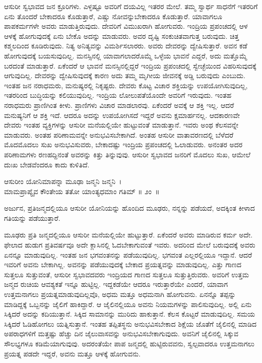 ಆಸುರೀ ಸ್ವಭಾವದ ಜನ ಕ್ರೂರಿಗಳು. ಎಳ್ಳಷ್ಟೂ ಅವರಿಗೆ ದಯವಿಲ್ಲ ಇತರರ ಮೇಲೆ. ತಮ್ಮ ಸ್ವಾರ್ಥ ಸಾಧನೆಗೆ ಇತರರಿಗೆ ಏನು ತೊಂದರೆ ಬೇಕಾದರೂ ಕೊಡುತ್ತಾರೆ, ಎಷ್ಚು ನೋವನ್ನು\break ಬೇಕಾದರೂ ಕೊಡುತ್ತಾರೆ. ಯಾವಾಗಲೂ ಪಾಪಕರ್ಮಗಳೇ ಅವರು ಮಾಡುತ್ತಿರುವುದು. ದೇವರಿಗೆ ವಿಮುಖರಾಗಿ ಹೋಗುವರು. ಇಂದ್ರಿಯ ಪ್ರಪಂಚದಲ್ಲಿ ಆಳ ಆಳಕ್ಕೆ ಹೋಗುವುದಕ್ಕೆ ಏನು ಬೇಕೊ ಅದನ್ನು ಮಾಡುವರು. ಅವರ ದೃಷ್ಟಿ ಸಂಕುಚಿತವಾಗುತ್ತ ಬರುವುದು. ಚಿತ್ತ ಕಶ್ಮಲದಿಂದ ಕೂಡಿರುವುದು. ನಿತ್ಯ ಅನಿತ್ಯವನ್ನು ವಿಮರ್ಶಿಸಲಾರರು. ಅವರು ದೇವರನ್ನು ದ್ವೇಷಿಸುತ್ತಾರೆ. ಅವನ ಕಡೆ ಹೋಗುವುದಕ್ಕೆ ಬಯಸುವುದಿಲ್ಲ. ಮನಸ್ಸಿನಲ್ಲಿ ಯಾವಾಗಲಾದರೊಮ್ಮೆ ಒಳ್ಳೆಯ ಭಾವನೆ ಎದ್ದರೆ, ಅದು ಮತ್ತೊಮ್ಮೆ ಬರದಂತೆ ಮಾಡುತ್ತಾರೆ. ಏಕೆಂದರೆ ಆ ಭಾವನೆ ಮನಸ್ಸಿನಲ್ಲಿದ್ದರೆ ಇಂದ್ರಿಯ ಪ್ರಪಂಚದಲ್ಲಿ ಸ್ವೇಚ್ಛೆಯಿಂದ ವಿಹರಿಸುವುದಕ್ಕೆ ಆಗುವುದಿಲ್ಲ. ದೇವರನ್ನು ದ್ವೇಷಿಸುವುದಕ್ಕೆ ಕಾರಣ ಅದು ತಮ್ಮ ಮೃಗೀಯ ಜೀವನಕ್ಕೆ ಅಡ್ಡಿ ಬರುವುದು ಎಂಬುದು. ಇಂತಹ ಜನ ನರಾಧಮರು, ಮನುಷ್ಯರಲ್ಲಿ ನಿಕೃಷ್ಟರು. ದೇವರು ಕೊಟ್ಟ ವಿಚಾರ ಶಕ್ತಿಯನ್ನು ಉಪಯೋಗಿಸುವುದಿಲ್ಲ, ಇತರರಿಂದ ಬುದ್ಧಿಯನ್ನು ಕಲಿಯುವುದಿಲ್ಲ. ಇಂದ್ರಿಯ ಲೋಲುಪತೆ\-ಯೊಂದೇ ಅವರಿಗೆ ಇರುವುದು. ಇಂತಹ ನರಾಧಮರು ಪ್ರಾಣಿಗಿಂತ ಕೀಳು. ಪ್ರಾಣಿಗಳು ವಿಚಾರ ಮಾಡಲಾರವು. ಏಕೆಂದರೆ ಅವಕ್ಕೆ ಆ ಶಕ್ತಿ ಇಲ್ಲ. ಆದರೆ ಮನುಷ್ಯನಿಗೆ ಆ ಶಕ್ತಿ ಇದೆ. ಆದರೂ ಅದನ್ನು ಉಪಯೋಗಿಸದೆ ಇದ್ದರೆ ಅವನು ಕ್ಷಮಾರ್ಹನಲ್ಲ. ಆದಕಾರಣವೇ ದೇವರು ಇಂತಹ ವ್ಯಕ್ತಿಗಳನ್ನು ಆಸುರೀ ಮನೆಯಲ್ಲಿಯೇ ಹುಟ್ಟುವಂತೆ ಮಾಡುತ್ತಾನೆ. ಇವರು ಅಂಥ ಕೆಲಸವನ್ನೇ ಮಾಡುವರು. ಅಂತಹ ಪರಿಣಾಮವನ್ನೇ ಅನುಭವಿಸಬೇಕಾಗಿದೆ. ಅಂತಹ ಆಸುರೀ ವಾತಾವರಣದಲ್ಲಿ ಬೆಳೆದರೆ ಮೊದಮೊದಲು ಸುಖ ಅನುಭವಿಸುವರು, ಬೇಕಾದಷ್ಟು ಇಂದ್ರಿಯ ಪ್ರಪಂಚದಲ್ಲಿ ಓಲಾಡುವರು. ಅನಂತರ ಅದರ ಪರಿಣಾಮಗಳು ರಣಹದ್ದಿನಂತೆ ಅವರನ್ನು ಕಿತ್ತು ತಿನ್ನುವುವು. ಆಸುರೀ ಸ್ವಭಾವದ ಜನರಿಗೆ ಮೊದಲು ಸುಖ, ಆಮೇಲೆ ದುಃಖ ಬೇಡವೆಂದರೂ ಕಾದು ಕುಳಿತಿದೆ.

\begin{shloka}
ಆಸುರೀಂ ಯೋನಿಮಾಪನ್ನಾ ಮೂಢಾ ಜನ್ಮನಿ ಜನ್ಮನಿ~।\\ಮಾಮಪ್ರಾಪ್ಯೈವ ಕೌಂತೇಯ ತತೋ ಯಾಂತ್ಯಧಮಾಂ ಗತಿಮ್ \hfill॥ ೨ಂ~॥
\end{shloka}

\begin{artha}
ಅರ್ಜುನ, ಪ್ರತಿಜನ್ಮದಲ್ಲಿಯೂ ಆಸುರೀ ಯೋನಿಯನ್ನು ಹೊಂದಿದ ಮೂಢರು, ನನ್ನನ್ನು ಪಡೆಯದೆ, ಅದಕ್ಕಿಂತ ಕೀಳಾದ ಗತಿಯನ್ನು ಪಡೆಯುತ್ತಾರೆ.
\end{artha}

ಮೂಢರು ಪ್ರತಿ ಜನ್ಮದಲ್ಲಿಯೂ ಆಸುರೀ ಮನೆಯಲ್ಲಿಯೇ ಹುಟ್ಟುತ್ತಾರೆ. ಏಕೆಂದರೆ ಅವರು ಮಾಡಿರುವ ಕರ್ಮ ಅದೇ. ಫೇಲಾದ ಹುಡುಗ ಪ್ರತಿವರ್ಷವೂ ಅದೇ ಕ್ಲಾಸಿನಲ್ಲಿ ಓದಬೇಕಾಗುವಂತೆ ಇವರು. ಅದರಿಂದ ಮೇಲೆ ಬರುವುದಕ್ಕೆ ಅವರು ಏನನ್ನೂ ಮಾಡುವುದಿಲ್ಲ. ಇಂತಹ ಜನ ಭಗವಂತನನ್ನು ಪಡೆಯುವುದಿಲ್ಲ. ಭಗವಂತ ಎಲ್ಲರಲ್ಲಿಯೂ ಇದ್ದಾನೆ. ಆದರೆ ಇವರಿಗೆ ಅವನು ಬೇಕಾಗಿಲ್ಲ. ಅವನನ್ನು ಪಡೆಯುವುದಕ್ಕೆ ಬೇಕಾದ ಪ್ರಯತ್ನವನ್ನು ಮಾಡುವುದಿಲ್ಲ. ಎತ್ತು ಗಾಣದ ಸುತ್ತಲೂ ಸುತ್ತುವಂತೆ, ಆಸುರೀ ಸ್ವಭಾವದವರು ಇಂದ್ರಿಯದ ಗಾಣದ ಸುತ್ತಲೂ ಸುತ್ತುತ್ತಿರುವರು. ಅವರಿಗೆ ಉತ್ತಮ ಜನ್ಮದ ರುಚಿಯ ಆವಶ್ಯಕತೆ ಇನ್ನೂ ಹುಟ್ಟಿಲ್ಲ. ಇದ್ದಕಡೆಯೇ ಆದರೂ ಇರುತ್ತಾರೆಯೇ ಎಂದರೆ, ಯಾವಾಗ ಉತ್ತಮನಾಗಲು ಪ್ರಯತ್ನಮಾಡುವುದಿಲ್ಲವೊ, ಅಧಮ ಮತ್ತೂ ಅಧಮನಾಗಿ ಹೋಗುವನು. ಏನನ್ನೊ ತಪ್ಪನ್ನು ಮಾಡಿದ್ದಕ್ಕೆ ಒಬ್ಬನನ್ನು ಜೈಲಿಗೆ ಹಾಕಿದ್ದಾರೆ. ಆ ಜೈಲಿನಲ್ಲಿಯೂ ಅವನು ನಿಯಮಗಳನ್ನು ಪಾಲಿಸುವುದಿಲ್ಲ. ಅಲ್ಲಿ ಏನು ಸಿಕ್ಕಿದರೆ ಅದನ್ನು ಕದಿಯುತ್ತಾನೆ. ಸಿಕ್ಕಿದ ಸಾಮಾನನ್ನು ಮುರಿದು ಹಾಕುತ್ತಾನೆ. ಕೆಲಸ ಕೊಟ್ಟರೆ ಮಾಡುವುದಿಲ್ಲ. ಸಮಯ ಸಿಕ್ಕಿದರೆ ಓಡಿಹೋಗಲು ಯತ್ನಿಸುತ್ತಾನೆ. ಇಂತಹ ತಪ್ಪಿತಸ್ಥನು ಅನುಭವಿಸಬೇಕಾದ ಶಿಕ್ಷೆಯ ಜೊತೆಗೆ ಜೈಲಿನಲ್ಲಿ ಮಾಡಿದ ಅಪರಾಧಗಳಿಗೆ ಮತ್ತಷ್ಟು ಹೆಚ್ಚು ದಿನ ಜೈಲುವಾಸವನ್ನು ಅನುಭವಿಸಬೇಕಾಗುವುದು. ಅವನಿಗೆ ಜೈಲಿನಲ್ಲಿ ಸಿಕ್ಕುವ ಸೌಲಭ್ಯಗಳೂ ಕಡಿಮೆಯಾಗುವುವು. ಅದರಂತೆಯೇ ಪಾಪ ಜನ್ಮದಲ್ಲಿ ಹುಟ್ಟಿರುವವನು, ಸ್ವಲ್ಪವಾದರೂ ಉತ್ತಮನಾಗಲು ಪ್ರಯತ್ನ ಪಡದೇ ಇದ್ದರೆ, ಅವನು ಮತ್ತೂ ಆಳಕ್ಕೆ ಹೋಗುವನು.

